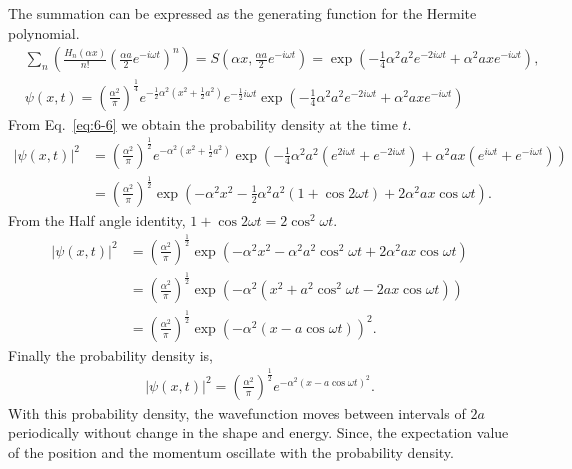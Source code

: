 \documentclass[floatfix,nofootinbib,superscriptaddress,fleqn]{revtex4-2}
\begin{document}
The summation can be expressed as the generating function for the Hermite polynomial.
\begin{align}
  &\sum_n\left(\frac{H_n(\alpha x)}{n!}
  \left( \frac{\alpha a}{2}e^{-i\omega t} \right)^n
  \right) = S\left(\alpha x,\frac{\alpha a}{2}
  e^{-i\omega t}\right)
  =\exp{\left(-\frac{1}{4}\alpha^2 a^2e^{-2i\omega t}+\alpha^2ax
  e^{-i\omega t}\right)},  \\
  \label{eq:6-6}&\psi(x,t)
  =\left(\frac{\alpha^2}{\pi}\right)
  ^{\frac{1}{4}}
  e^{-\frac{1}{2}\alpha^2
  \left(x^2+\frac{1}{2}a^2\right)}
  e^{-\frac{1}{2}i\omega t}
  \exp{\left(-\frac{1}{4}\alpha^2 
  a^2e^{-2i\omega t}
  +\alpha^2axe^{-i\omega t}\right)}
\end{align}
From Eq.~\eqref{eq:6-6} we obtain the probability density at the time $t$.
\begin{align*}
    |\psi(x,t)|^2
    &=\left(\frac{\alpha^2}{\pi}\right)^{\frac{1}{2}}
    e^{-\alpha^2\left(x^2+\frac{1}{2}a^2\right)}
    \exp{\left(-\frac{1}{4}\alpha^2 a^2
    (e^{2i\omega t}+e^{-2i\omega t})
    +\alpha^2ax(e^{i\omega t}+e^{-i\omega t})\right)} \\
    &=\left(\frac{\alpha^2}{\pi}\right)^{\frac{1}{2}}
    \exp{\left(-\alpha^2x^2
    -\frac{1}{2}\alpha^2 a^2
    (1+\cos{2\omega t})
    +2\alpha^2ax\cos{\omega t}\right)}.
\end{align*}
From the Half angle identity,
$1+\cos{2\omega t}=2\cos^2{\omega t}$.
\begin{align*}
    |\psi(x,t)|^2&=\left(\frac{\alpha^2}{\pi}\right)^{\frac{1}{2}}
    \exp{\left(-\alpha^2x^2
    -\alpha^2 a^2\cos^2{\omega t}
    +2\alpha^2ax\cos{\omega t}\right)}  \\
    &=\left(\frac{\alpha^2}{\pi}\right)^{\frac{1}{2}}
    \exp{\left(-\alpha^2(x^2
    +a^2\cos^2{\omega t}
    -2ax\cos{\omega t})\right)} \\
    &=\left(\frac{\alpha^2}{\pi}\right)^{\frac{1}{2}}
    \exp{\left(-\alpha^2(x
    -a\cos{\omega t})\right)^2}.
\end{align*}
Finally the probability density is,
\begin{align}
  |\psi(x,t)|^2
  =\left(\frac{\alpha^2}{\pi}\right)^{\frac{1}{2}}
  e^{-\alpha^2(x-a\cos{\omega t})^2} .
\end{align}
With this probability density, the wavefunction moves between 
intervals of $2a$ periodically without change in the shape and energy.
Since, the expectation value of the position and the momentum oscillate 
with the probability density.
\vspace{1cm}
\end{document}
